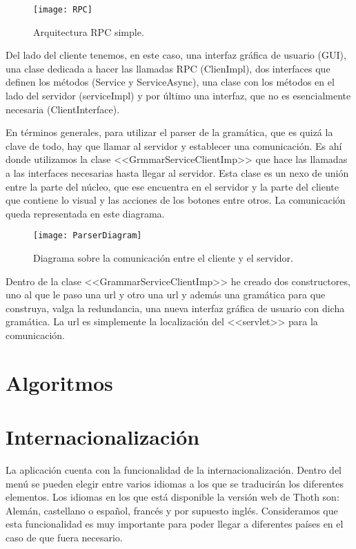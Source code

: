 \begin{figure}[h]
\centering
\texttt{[image: RPC]}
\caption{Arquitectura RPC simple.}
\label{fig:5.1}
\end{figure}

Del lado del cliente tenemos, en este caso, una interfaz gráfica de usuario (GUI), una clase dedicada a hacer las llamadas RPC (ClienImpl), dos interfaces que definen los métodos (Service y ServiceAsync), una clase con los métodos en el lado del servidor (serviceImpl) y por último una interfaz, que no es esencialmente necesaria (ClientInterface). 

En términos generales, para utilizar el parser de la gramática, que es quizá la clave de todo, hay que llamar al servidor y establecer una comunicación. Es ahí donde utilizamos la clase <<GrmmarServiceClientImp>> que hace las llamadas a las interfaces necesarias hasta llegar al servidor. Esta clase es un nexo de unión entre la parte del núcleo, que ese encuentra en el servidor y la parte del cliente que contiene lo visual y las acciones de los botones entre otros. La comunicación queda representada en este diagrama.

\begin{figure}[h]
\centering
\texttt{[image: ParserDiagram]}
\caption{Diagrama sobre la comunicación entre el cliente y el servidor.}
\label{fig:5.1}
\end{figure}

Dentro de la clase <<GrammarServiceClientImp>> he creado dos constructores, uno al que le paso una url y otro una url y además una gramática para que construya, valga la redundancia, una nueva interfaz gráfica de usuario con dicha gramática. La url es simplemente la localización del <<servlet>> para la comunicación.

\section{Algoritmos}


\section{Internacionalización}
La aplicación cuenta con la funcionalidad de la internacionalización. Dentro del menú se pueden elegir entre varios idiomas a los que se traducirán los diferentes elementos. Los idiomas en los que está disponible la versión web de Thoth son: Alemán, castellano o español, francés y por supuesto inglés. Consideramos que esta funcionalidad es muy importante para poder llegar a diferentes países en el caso de que fuera necesario.

